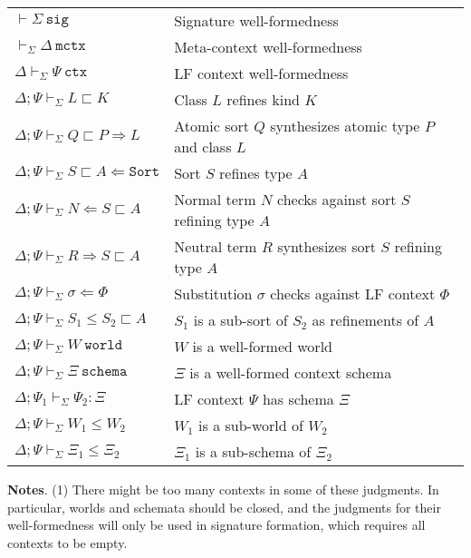\documentclass[letterpaper, 11pt]{article}
\newcommand{\Rar}{\Rightarrow}
\newcommand{\Lar}{\Leftarrow}
\newcommand{\Sort}{\texttt{Sort}}
\newcommand{\world}{\texttt{world}}
\newcommand{\schema}{\texttt{schema}}
\newcommand{\ctx}{\texttt{ctx}}
\newcommand{\mctx}{\texttt{mctx}}
\newcommand{\sctx}{\texttt{sctx}}
\newcommand{\sig}{\texttt{sig}}
\begin{document}
    \begin{tabular}{ll}
        $ \vdash \Sigma \ \sig $                                       & Signature well-formedness \\
        $ \vdash_\Sigma \Delta \ \mctx $                         & Meta-context well-formedness \\
        $  \Delta \vdash_\Sigma \Psi \ \ctx $                    & LF context well-formedness \\
        $  \Delta; \Psi \vdash_\Sigma L \sqsubset K $            & Class $L$ refines kind $K$ \\
        $  \Delta; \Psi \vdash_\Sigma Q \sqsubset P \Rar L $     & Atomic sort $Q$ synthesizes atomic type $P$ and class $L$ \\
        $  \Delta; \Psi \vdash_\Sigma S \sqsubset A \Lar \Sort $ & Sort $S$ refines type $A$ \\
        $  \Delta; \Psi \vdash_\Sigma N \Lar S \sqsubset A $     & Normal term $N$ checks against sort $S$ refining type $A$ \\
        $  \Delta; \Psi \vdash_\Sigma R \Rar S \sqsubset A $     & Neutral term $R$ synthesizes sort $S$ refining type $A$ \\
        $  \Delta; \Psi \vdash_\Sigma \sigma \Lar \Phi $         & Substitution $\sigma$ checks against LF context $\Phi$ \\
        $  \Delta; \Psi \vdash_\Sigma S_1 \leq S_2 \sqsubset A $ & $S_1$ is a sub-sort of $S_2$ as refinements of $A$ \\
        $  \Delta; \Psi \vdash_\Sigma W \ \world $               & $W$ is a well-formed world \\
        $  \Delta; \Psi \vdash_\Sigma \Xi \ \schema $            & $\Xi$ is a well-formed context schema \\
        $  \Delta; \Psi_1 \vdash_\Sigma \Psi_2 : \Xi $           & LF context $\Psi$ has schema $\Xi$ \\
        $  \Delta; \Psi \vdash_\Sigma W_1 \leq W_2 $             & $W_1$ is a sub-world of $W_2$\\
        $  \Delta; \Psi \vdash_\Sigma \Xi_1 \leq \Xi_2 $         & $\Xi_1$ is a sub-schema of $\Xi_2$
    \end{tabular}

    \textbf{Notes}. (1) There might be too many contexts in some of these judgments.  In particular, worlds and schemata should be closed, and the judgments
    for their well-formedness will only be used in signature formation, which requires all contexts to be empty.
    
\end{document}
